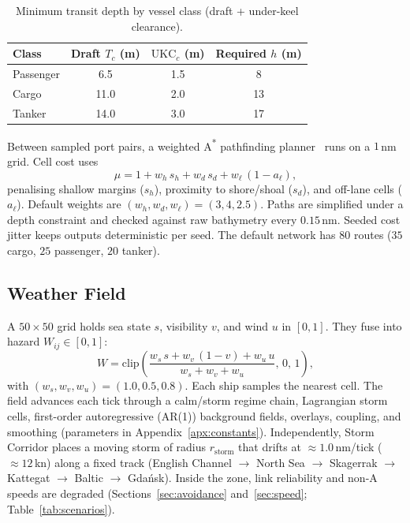 \documentclass[cameraready]{Interspeech}
\begin{document}
\begin{table}[h]
\centering
\caption{Minimum transit depth by vessel class (draft + under-keel clearance).}
\label{tab:draft}
\begin{tabular}{@{}lccc@{}}
\toprule
Class & Draft $T_c$ (m) & $\text{UKC}_c$ (m) & Required $h$ (m) \\
\midrule
Passenger & 6.5 & 1.5 & 8 \\
Cargo     & 11.0 & 2.0 & 13 \\
Tanker    & 14.0 & 3.0 & 17 \\
\bottomrule
\end{tabular}
\end{table}

Between sampled port pairs, a weighted A\textsuperscript{*} pathfinding planner~\cite{hart1968astar} runs on a $1$\,nm grid. Cell cost uses
\begin{equation*}
  \mu = 1 + w_h\,s_h + w_d\,s_d + w_\ell\,(1 - a_\ell),
\end{equation*}
penalising shallow margins ($s_h$), proximity to shore/shoal ($s_d$), and off-lane cells ($a_\ell$). Default weights are $(w_h, w_d, w_\ell) = (3, 4, 2.5)$. Paths are simplified under a depth constraint and checked against raw bathymetry every $0.15$\,nm. Seeded cost jitter keeps outputs deterministic per seed. The default network has $80$ routes ($35$ cargo, $25$ passenger, $20$ tanker).

\subsection{Weather Field}
\label{sec:weather}

A $50\times50$ grid holds sea state $s$, visibility $v$, and wind $u$ in $[0,1]$. They fuse into hazard $W_{ij}\in[0,1]$:
\begin{equation}
  W = \mathrm{clip}\left(\frac{w_s\,s + w_v\,(1-v) + w_u\,u}{w_s + w_v + w_u},\,0,\,1\right),
  \label{eq:W}
\end{equation}
with $(w_s, w_v, w_u) = (1.0, 0.5, 0.8)$. Each ship samples the nearest cell. The field advances each tick through a calm/storm regime chain, Lagrangian storm cells, first-order autoregressive (AR(1)) background fields, overlays, coupling, and smoothing (parameters in Appendix~\ref{apx:constants}). Independently, Storm Corridor places a moving storm of radius $r_{\text{storm}}$ that drifts at ${\approx}1.0$\,nm/tick (${\approx}12$\,kn) along a fixed track (English Channel $\to$ North Sea $\to$ Skagerrak $\to$ Kattegat $\to$ Baltic $\to$ Gda\'nsk). Inside the zone, link reliability and non-A speeds are degraded (Sections~\ref{sec:avoidance} and~\ref{sec:speed}; Table~\ref{tab:scenarios}).
\end{document}
